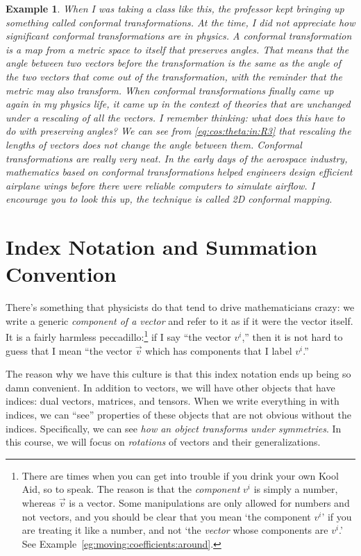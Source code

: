 \documentclass[12pt]{article}
\newtheorem{example}{Example}[section]
\begin{document}
\begin{example}
When I was taking a class like this, the professor kept bringing up something called conformal transformations. At the time, I did not appreciate how significant conformal transformations are in physics. A conformal transformation is a map from a metric space to itself that \emph{preserves angles}. That means that the angle between two vectors before the transformation is the same as the angle of the two vectors that come out of the transformation, with the reminder that the metric may also transform. When conformal transformations finally came up again in my physics life, it came up in the context of theories that are unchanged under a rescaling of all the vectors. I remember thinking: \emph{what does this have to do with preserving angles}? We can see from \eqref{eq:cos:theta:in:R3} that rescaling the lengths of vectors does not change the angle between them. Conformal transformations are really very neat. In the early days of the aerospace industry, mathematics based on conformal transformations helped engineers design efficient airplane wings before there were reliable computers to simulate airflow. I encourage you to look this up, the technique is called 2D conformal mapping.
\end{example}

\section{Index Notation and Summation Convention}
\label{sec:index:notation}

There's something that physicists do that tend to drive mathematicians crazy: we write a generic \emph{component of a vector} and refer to it as if it were the vector itself. It is a fairly harmless peccadillo:\footnote{There are times when you can get into trouble if you drink your own Kool Aid, so to speak. The reason is that the \emph{component} $v^i$ is simply a number, whereas $\vec{v}$ is a vector. Some manipulations are only allowed for numbers and not vectors, and you should be clear that you mean `the component $v^i$' if you are treating it like a number, and not `the \emph{vector} whose components are $v^i$.' See Example~\ref{eg:moving:coefficients:around}.} if I say ``the vector $v^i$,'' then it is not hard to guess that I mean ``the vector $\vec{v}$ which has components that I label $v^i$.''

The reason why we have this culture is that this index notation ends up being so damn convenient. In addition to vectors, we will have other objects that have indices: dual vectors, matrices, and tensors. When we write everything in with indices, we can ``see'' properties of these objects that are not obvious without the indices. Specifically, we can see \emph{how an object transforms under symmetries}. In this course, we will focus on \emph{rotations} of vectors and their generalizations.  
\end{document}
